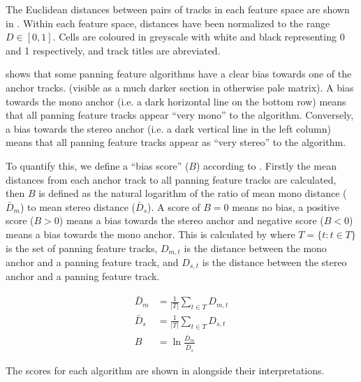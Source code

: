 \documentclass[twoside,a4paper]{article}
\begin{document}
The Euclidean distances between pairs of tracks in each feature space are shown in . Within each feature space, distances have been normalized to the range $D \in [0,1]$. Cells are coloured in greyscale with white and black representing 0 and 1 respectively, and track titles are abreviated.

 shows that some panning feature algorithms have a clear bias towards one of the anchor tracks. (visible as a much darker section in otherwise pale matrix). A bias towards the mono anchor (i.e. a dark horizontal line on the bottom row) means that all panning feature tracks appear \enquote{very mono} to the algorithm. Conversely, a bias towards the stereo anchor (i.e. a dark vertical line in the left column) means that all panning feature tracks appear as \enquote{very stereo} to the algorithm.

To quantify this, we define a \enquote{bias score} ($B$) according to . Firstly the mean distances from each anchor track to all panning feature tracks are calculated, then $B$ is defined as the natural logarithm of the ratio of mean mono distance ($\bar{D}_m$) to mean stereo distance ($\bar{D}_s$). A score of $B=0$ means no bias, a positive score ($B>0$) means a bias towards the stereo anchor and negative score ($B<0$) means a bias towards the mono anchor. This is calculated by  where $T = \{ t : t \in T \}$ is the set of panning feature tracks, $D_{m,t}$ is the distance between the mono anchor and a panning feature track, and $D_{s,t}$ is the distance between the stereo anchor and a panning feature track.

\begin{equation}
  \label{eq:bias_score}
  \begin{split}
    \bar{D}_m &= \frac{1}{|T|} \sum_{t \in T} D_{m,t} \\
    \bar{D}_s &= \frac{1}{|T|} \sum_{t \in T} D_{s,t} \\
    B &= \ln\frac{\bar{D}_m}{\bar{D}_s}
  \end{split}
\end{equation}

The scores for each algorithm are shown in  alongside their interpretations. 
\end{document}
